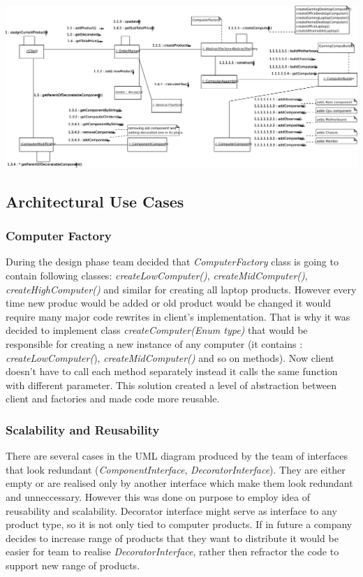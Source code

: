 \documentclass[pdftex,11pt,a4paper]{article}
\begin{document}
\begin{center}
	\includegraphics[scale=1, angle=90]{images/CollaborationDiagram.pdf}
\end{center}

\subsection{Architectural Use Cases}

\subsubsection{Computer Factory}
During the design phase team decided that \emph{ComputerFactory} class is going to contain following classes: \emph{createLowComputer()}, \emph{createMidComputer()}, \emph{createHighComputer()} and similar for creating all laptop products. However every time new produc would be added or old product would be changed it would require many major code rewrites in client's implementation. That is why it was decided to implement class \emph{createComputer(Enum type)} that would be responsible for creating a new instance of any computer (it contains : \emph{createLowComputer(}), \emph{createMidComputer()} and so on methods). Now client doesn't have to call each method separately instead it calls the same function with different parameter. This solution created a level of abstraction between client and factories and made code more reusable.

\subsubsection{Scalability and Reusability}
There are several cases in the UML diagram produced by the team of interfaces that look redundant (\emph{ComponentInterface}, \emph{DecoratorInterface}). They are either empty or are realised only by another interface which make them look redundant and unneccessary. However this was done on purpose to employ idea of reusability and scalability. Decorator interface might serve as interface to any product type, so it is not only tied to computer products. If in future a company decides to increase range of products that they want to distribute it would be easier for team to realise \emph{DecoratorInterface}, rather then refractor the code to support new range of products. 
\end{document}
